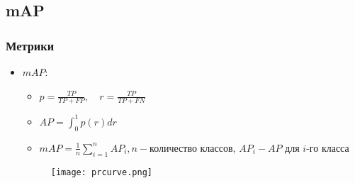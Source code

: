\subsection{mAP}
\begin{frame}
    \frametitle{Метрики}
    \begin{itemize}
        \item \(mAP\):
        \begin{itemize}
            \item \(p=\frac{TP}{TP+FP}, \quad r=\frac{TP}{TP+FN}\)
            \item \(AP=\int_{0}^{1}p(r)dr\)
            \item \(mAP=\frac{1}{n}\sum_{i=1}^{n}AP_{i}, n -\)количество классов, \(AP_{i} - AP\) для \(i\)-го класса
        \end{itemize}

        \begin{figure}
            \texttt{[image: prcurve.png]}
        \end{figure}
    \end{itemize}
\end{frame}


\begin{frame}
    \begin{center}
    \end{center}
\end{frame}